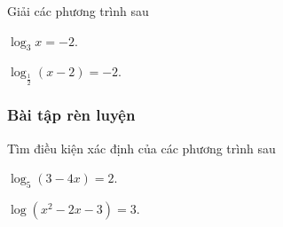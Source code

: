 \begin{vd} %
	Giải các phương trình sau
	\begin{listEX}[2]
		\item $\log _3 x=-2$.
		\item $\log _{\tfrac{1}{2}}(x-2)=-2$.
	\end{listEX}
\end{vd}

\subsubsection{Bài tập rèn luyện} 

\begin{bt}
	Tìm điều kiện xác định của các phương trình sau
	\begin{listEX}[2]
		\item $\log_5(3-4x)=2$.
		\item $\log(x^2-2x-3)=3$.
	\end{listEX}
\end{bt}

